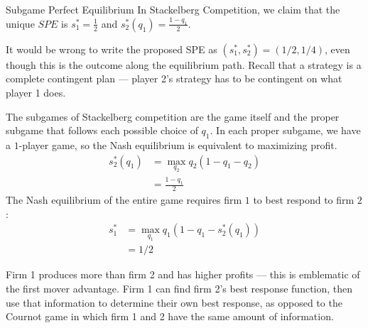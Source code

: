 \documentclass[8pt]{extarticle}
\begin{document}
\begin{problem}{Subgame Perfect Equilibrium}
    In Stackelberg Competition, we claim that the unique $SPE$ is $s_1^* = \frac{1}{2}$ and $s_2^*(q_1) = \frac{1-q_1}{2}$.
    \begin{description}
      \small
      \item[Note:] It would be wrong to write the proposed SPE as $(s_1^*,s_2^*) = (1/2,1/4)$, even though this is the outcome along the equilibrium path. Recall that a strategy is a complete contingent plan --- player 2's strategy has to be contingent on what player 1 does.
    \end{description}
    The subgames of Stackelberg competition are the game itself and the proper subgame that follows each possible choice of $q_1$. In each proper subgame, we have a $1$-player game, so the Nash equilibrium is equivalent to maximizing profit.
    \begin{align*}
      s_2^*(q_1) &= \max_{q_2}q_2(1-q_1-q_2)\\
                 &= \frac{1-q_1}{2}
    \end{align*}
    The Nash equilibrium of the entire game requires firm $1$ to best respond to firm $2$:
    \begin{align*}
      s_1^* &= \max_{q_1}q_1(1-q_1-s_2^*(q_1))\\
            &= 1/2
    \end{align*}
    \begin{description}
      \small
      \item[Note:] Firm 1 produces more than firm 2 and has higher profits --- this is emblematic of the first mover advantage. Firm 1 can find firm 2's best response function, then use that information to determine their own best response, as opposed to the Cournot game in which firm 1 and 2 have the same amount of information.
    \end{description}
  \end{problem}
\end{document}

